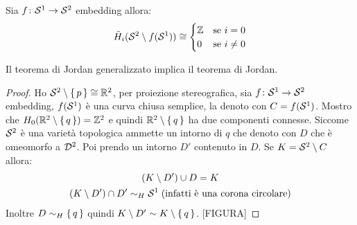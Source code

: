 \begin{example}
  Sia $ f \colon \mathcal{S}^{1} \to \mathcal{S}^{2} $ embedding allora:
  \[
    \tilde{H}_i(\mathcal{S}^{2} \setminus f(\mathcal{S}^{1})) \cong
    \begin{cases}
      \mathbb{Z} & \text{se } i = 0 \\
      0 & \text{se } i \not = 0
    \end{cases}
  \]
\end{example}

\begin{proposition}
  Il teorema di Jordan generalizzato implica il teorema di Jordan.
\end{proposition}
\begin{proof}
  Ho $ \mathcal{S}^{2} \setminus \set{p} \cong \mathbb{R}^{2} $, per proiezione stereografica, sia
  $ f \colon \mathcal{S}^{1} \to \mathcal{S}^{2} $ embedding, $ f(\mathcal{S}^{1}) $ è una curva chiusa
  semplice, la denoto con $ C = f(\mathcal{S}^{1})$. Mostro che
  $ H_0(\mathbb{R}^{2} \setminus \set{q}) = \mathbb{Z}^2 $ e quindi
  $ \mathbb{R}^{2} \setminus \set{q} $ ha due componenti connesse. Siccome $ \mathcal{S}^{2} $ è una
  varietà topologica ammette un intorno di $ q $ che denoto con $ D $ che è
  omeomorfo a $ \mathcal{D}^{2} $. Poi prendo un intorno $ D' $ contenuto in $ D $.
  Se $ K = \mathcal{S}^{2} \setminus C $ allora:
  \begin{gather*}
    (K \setminus D') \cup D = K \\
    (K \setminus D') \cap D' \sim_H \mathcal{S}^{1} \; (\text{infatti è una corona circolare})
  \end{gather*}
  Inoltre $ D \sim_H \set{q} $ quindi $ K \setminus D' \sim K \setminus \set{q} $.
  [FIGURA]

\end{proof}
